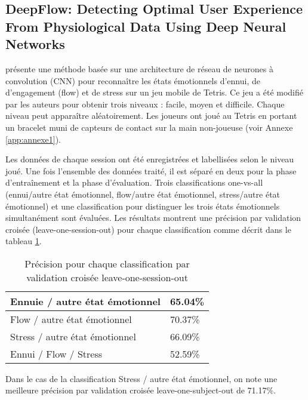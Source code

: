 \documentclass{article}
\begin{document}
    \subsection{DeepFlow: Detecting Optimal User Experience From Physiological Data Using Deep Neural Networks}
        \cite{maier_et_al._2019} présente une méthode basée sur une architecture de réseau de neurones à convolution (CNN) pour reconnaître les états émotionnels d’ennui, de d'engagement (flow) et de stress sur un jeu mobile de Tetris. 
        Ce jeu a été modifié par les auteurs pour obtenir trois niveaux : facile, moyen et difficile. Chaque niveau peut apparaître aléatoirement. 
        Les joueurs ont joué au Tetris en portant un bracelet muni de capteurs de contact sur la main non-joueuse (voir Annexe \ref{app:annexe1}).\par
        Les données de chaque session ont été enregistrées et labellisées selon le niveau joué. Une fois l'ensemble des  données traité, il est séparé en deux pour la phase d’entraînement et la phase d’évaluation. 
        Trois classifications one-vs-all (ennui/autre état émotionnel, flow/autre état émotionnel, stress/autre état émotionnel) et une classification pour distinguer les trois états émotionnels simultanément sont évaluées. Les résultats montrent une précision par validation croisée (leave-one-session-out) pour chaque classification comme décrit dans le tableau \ref{tab:maieretal2019}.
        \begin{table}
            \centering
            \begin{tabular}{l|l}
                \hline 
                Ennuie / autre état émotionnel & 65.04\% \\ \hline
                Flow / autre état émotionnel & 70.37\% \\ \hline
                Stress / autre état émotionnel & 66.09\% \\ \hline
                Ennui / Flow / Stress & 52.59\% \\
                \hline
            \end{tabular}
            \caption{Précision pour chaque classification par validation croisée leave-one-session-out}
            \label{tab:maieretal2019}
        \end{table}
        Dans le cas de la classification Stress / autre état émotionnel, on note une meilleure précision par validation croisée leave-one-subject-out de 71.17\%.
\end{document}
